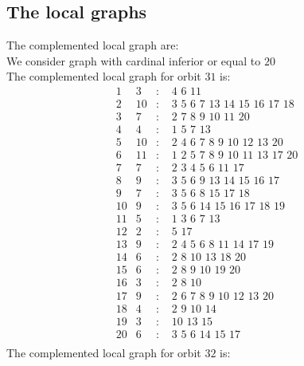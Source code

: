\documentclass[12pt]{article}
\begin{document}
\subsection{The local graphs}
The complemented local graph are:\\
We consider graph with cardinal inferior or equal to $20$\\
The complemented local graph for orbit $31$ is:
\begin{equation*}
\begin{array}{rrcl}
1&3&:&\,\,4\,\,6\,\,11\\
2&10&:&\,\,3\,\,5\,\,6\,\,7\,\,13\,\,14\,\,15\,\,16\,\,17\,\,18\\
3&7&:&\,\,2\,\,7\,\,8\,\,9\,\,10\,\,11\,\,20\\
4&4&:&\,\,1\,\,5\,\,7\,\,13\\
5&10&:&\,\,2\,\,4\,\,6\,\,7\,\,8\,\,9\,\,10\,\,12\,\,13\,\,20\\
6&11&:&\,\,1\,\,2\,\,5\,\,7\,\,8\,\,9\,\,10\,\,11\,\,13\,\,17\,\,20\\
7&7&:&\,\,2\,\,3\,\,4\,\,5\,\,6\,\,11\,\,17\\
8&9&:&\,\,3\,\,5\,\,6\,\,9\,\,13\,\,14\,\,15\,\,16\,\,17\\
9&7&:&\,\,3\,\,5\,\,6\,\,8\,\,15\,\,17\,\,18\\
10&9&:&\,\,3\,\,5\,\,6\,\,14\,\,15\,\,16\,\,17\,\,18\,\,19\\
11&5&:&\,\,1\,\,3\,\,6\,\,7\,\,13\\
12&2&:&\,\,5\,\,17\\
13&9&:&\,\,2\,\,4\,\,5\,\,6\,\,8\,\,11\,\,14\,\,17\,\,19\\
14&6&:&\,\,2\,\,8\,\,10\,\,13\,\,18\,\,20\\
15&6&:&\,\,2\,\,8\,\,9\,\,10\,\,19\,\,20\\
16&3&:&\,\,2\,\,8\,\,10\\
17&9&:&\,\,2\,\,6\,\,7\,\,8\,\,9\,\,10\,\,12\,\,13\,\,20\\
18&4&:&\,\,2\,\,9\,\,10\,\,14\\
19&3&:&\,\,10\,\,13\,\,15\\
20&6&:&\,\,3\,\,5\,\,6\,\,14\,\,15\,\,17\\
\end{array}
\end{equation*}
The complemented local graph for orbit $32$ is:
\end{document}
